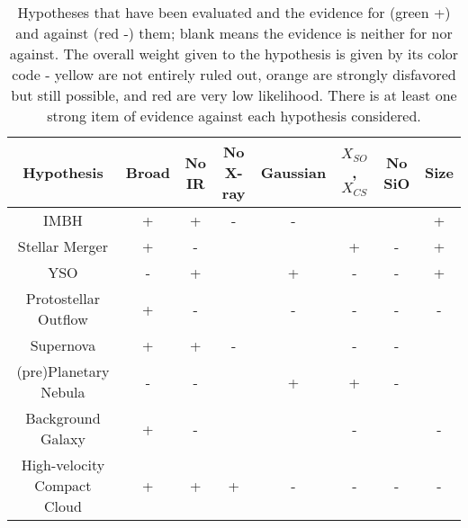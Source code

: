 
\begin{table}[htp]
    \centering
    \begin{tabular}{|c|c|c|c|c|c|c|c|}
         \hline
         Hypothesis & Broad & No IR & No X-ray & Gaussian & $X_{SO}$, $X_{CS}$ & No SiO & Size \\
         \hline
         IMBH \cellcolor{yellow!25} & \cellcolor{green!25}+ & \cellcolor{green!25}+ & \cellcolor{red!25}- & \cellcolor{red!25}- & & & \cellcolor{green!25}+\\
         \hline
         Stellar Merger \cellcolor{yellow!25} & \cellcolor{green!25}+ & \cellcolor{red!25}- & & & \cellcolor{green!25}+ & \cellcolor{red!25}-  & \cellcolor{green!25}+\\
         \hline
         YSO  \cellcolor{yellow!25} & \cellcolor{red!25}- &  \cellcolor{green!25}+ & & \cellcolor{green!25}+ & \cellcolor{red!25}- & \cellcolor{red!25}- &\cellcolor{green!25}+  \\
         \hline
         Protostellar Outflow \cellcolor{orange!25} & \cellcolor{green!25}+ & \cellcolor{red!25}- & & \cellcolor{red!25}- & \cellcolor{red!25}- & \cellcolor{red!25}-  & \cellcolor{red!25}-\\
         \hline
         Supernova \cellcolor{orange!25}& \cellcolor{green!25}+ & \cellcolor{green!25}+ & \cellcolor{red!25}- & & \cellcolor{red!25}- & \cellcolor{red!25}- & \\
         \hline
         (pre)Planetary Nebula \cellcolor{orange!25}& \cellcolor{red!25}- & \cellcolor{red!25}- & &  \cellcolor{green!25}+ & \cellcolor{green!25}+ & \cellcolor{red!25}- & \\
         \hline
         Background Galaxy \cellcolor{red!25}& \cellcolor{green!25}+ & \cellcolor{red!25}- & & & \cellcolor{red!25}- &  & \cellcolor{red!25}-\\
         \hline
         High-velocity Compact Cloud  \cellcolor{red!25}& \cellcolor{green!25}+ & \cellcolor{green!25}+ & \cellcolor{green!25}+ & \cellcolor{red!25}- & \cellcolor{red!25}- & \cellcolor{red!25}- & \cellcolor{red!25}-\\
         \hline
    \end{tabular}
    \caption{Hypotheses that have been evaluated and the evidence for (green +) and against (red -) them; blank means the evidence is neither for nor against.
    The overall weight given to the hypothesis is given by its color code - yellow are not entirely ruled out, orange are strongly disfavored but still possible, and red are very low likelihood.
    There is at least one strong item of evidence against each hypothesis considered.
    }
    \label{tab:hypotheses}
\end{table}
